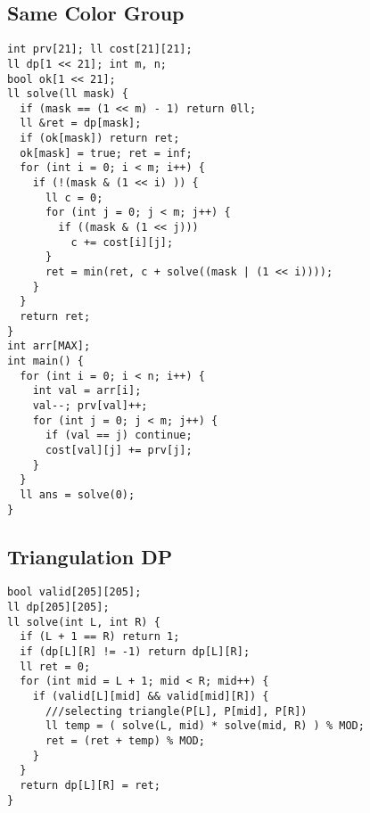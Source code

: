 \documentclass[10pt,a4paper,onesided]{article}
\begin{document}
\begin{multicols*}{3}
\subsection{Same Color Group}
\begin{lstlisting}
int prv[21]; ll cost[21][21];
ll dp[1 << 21]; int m, n;
bool ok[1 << 21];
ll solve(ll mask) {
  if (mask == (1 << m) - 1) return 0ll;
  ll &ret = dp[mask];
  if (ok[mask]) return ret;
  ok[mask] = true; ret = inf;
  for (int i = 0; i < m; i++) {
    if (!(mask & (1 << i) )) {
      ll c = 0;
      for (int j = 0; j < m; j++) {
        if ((mask & (1 << j)))
          c += cost[i][j];
      }
      ret = min(ret, c + solve((mask | (1 << i))));
    }
  }
  return ret;
}
int arr[MAX];
int main() {
  for (int i = 0; i < n; i++) {
    int val = arr[i];
    val--; prv[val]++;
    for (int j = 0; j < m; j++) {
      if (val == j) continue;
      cost[val][j] += prv[j];
    }
  }
  ll ans = solve(0);
}

\end{lstlisting}
\subsection{Triangulation DP}
\begin{lstlisting}
bool valid[205][205];
ll dp[205][205];
ll solve(int L, int R) {
  if (L + 1 == R) return 1;
  if (dp[L][R] != -1) return dp[L][R];
  ll ret = 0;
  for (int mid = L + 1; mid < R; mid++) {
    if (valid[L][mid] && valid[mid][R]) {
      ///selecting triangle(P[L], P[mid], P[R])
      ll temp = ( solve(L, mid) * solve(mid, R) ) % MOD;
      ret = (ret + temp) % MOD;
    }
  }
  return dp[L][R] = ret;
}
\end{lstlisting}

\end{multicols*}
\end{document}
